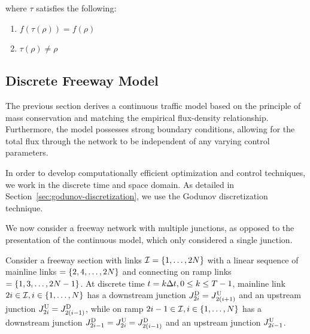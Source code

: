 where $\tau$ satisfies the following:

\begin{enumerate}
	\item $f(\tau(\rho)) = f(\rho)$
	\item $\tau(\rho) \neq \rho$
\end{enumerate}

\subsection{Discrete Freeway Model}

The previous section derives a continuous traffic model based on the principle of mass conservation and matching the empirical flux-density relationship. Furthermore, the model possesses strong boundary conditions, allowing for the total flux through the network to be independent of any varying control parameters.

In order to develop computationally efficient optimization and control techniques, we work in the discrete time and space domain. As detailed in Section~\ref{sec:godunov-discretization}, we use the Godunov discretization technique.

We now consider a freeway network with multiple junctions, as opposed to the presentation of the continuous model, which only considered a single junction.

Consider a freeway section with links $\mathcal{I}=\left\{ 1,\ldots,2N\right\}$
with a linear sequence of mainline links $=\left\{ 2,4,\ldots,2N\right\}$
and connecting on ramp links $=\left\{ 1,3,\ldots,2N-1\right\}$. At discrete
time $t=k\Delta t,0\le k\le T-1$, mainline link $2i\in\mathcal{I},i\in\left\{ 1,\ldots,N\right\}$
has a downstream junction $J_{2i}^{\text{D}}=J_{2\left(i+1\right)}^{\text{U}}$
and an upstream junction $J_{2i}^{\text{U}}=J_{2\left(i-1\right)}^{\text{D}}$,
while on ramp $2i-1\in\mathcal{I},i\in\left\{ 1,\ldots,N\right\}$ has a downstream
junction $J_{2i-1}^{\text{D}}=J_{2i}^{\text{U}}=J_{2\left(i-1\right)}^{\text{D}}$
and an upstream junction $J_{2i-1}^{\text{U}}$.

